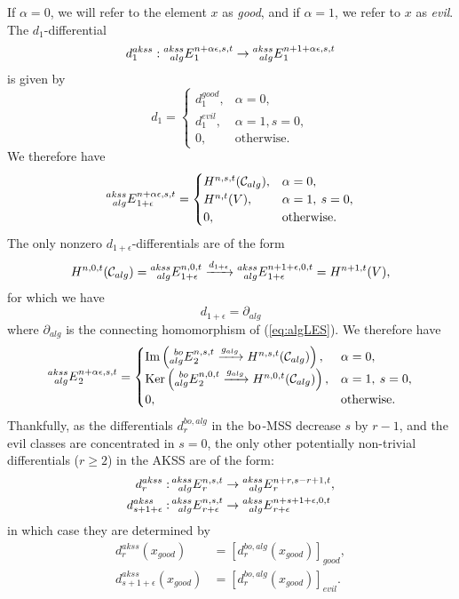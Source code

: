 If $\alpha = 0$, we will refer to the element $x$ as \emph{good}, and if $\alpha = 1$, we refer to $x$ as \emph{evil}.  
The $d_1$-differential 
$$ d^{akss}_{1}: \prescript{akss}{alg}{E}^{n+\alpha \epsilon, s, t}_1 \rightarrow \prescript{akss}{alg}{E}^{n+ 1+\alpha\epsilon, s,t}_1
$$
is given by
$$d_1 = 
\begin{cases}
d_1^{good}, & \alpha = 0, \\
d_1^{evil}, & \alpha = 1, s = 0, \\
0, & \text{otherwise}. 
\end{cases}
$$
We therefore have
$$\prescript{akss}{alg}{E}^{n+\alpha \epsilon, s, t}_{1+\epsilon} = 
\begin{cases}
H^{n, s, t}(\mathcal{C}_{alg}), & \alpha = 0, \\
H^{n, t}(V), & \alpha = 1, \: s = 0, \\
0, & \text{otherwise}.
\end{cases}
$$
The only nonzero $d_{1+\epsilon}$-differentials are of the form
$$ H^{n, 0, t}(\mathcal{C}_{alg}) = \prescript{akss}{alg}{E}^{n, {0}, t}_{1+\epsilon} \xrightarrow{d_{1+\epsilon}} \prescript{akss}{alg}{E}^{n+1 + \epsilon, 0, t}_{1+\epsilon} = H^{n+1, t}(V), $$
for which we have 
$$ d_{1+\epsilon} = \partial_{alg} $$
where $\partial_{alg}$ is the connecting homomorphism of (\ref{eq:algLES}).
We therefore have
$$ \prescript{akss}{alg}{E}^{n+\alpha\epsilon,s,t}_2 = 
\begin{cases}
\mathrm{Im} \left( \prescript{bo}{alg}{E}^{n, s, t}_{{2}} \xrightarrow{g_{alg}} H^{n, s, t}(\mathcal{C}_{alg}) \right), & \alpha = 0, \\
\mathrm{Ker} \left( \prescript{bo}{alg}{E}^{n, {0}, t}_{{2}} \xrightarrow{g_{alg}} H^{n, {0}, t}(\mathcal{C}_{alg}) \right), & \alpha = 1, \: s = 0, \\
0, & \text{otherwise}.
\end{cases} $$
Thankfully, as the differentials $d^{bo,alg}_r$ in the $\mathrm{bo}$-MSS decrease $s$ by $r-1$, and the evil classes are concentrated in $s = 0$, the only other potentially non-trivial differentials ($r \ge 2$) in the AKSS are of the form:
\begin{align*}
d^{akss}_r: & \prescript{akss}{alg}{E}_{r}^{n, s, t} \rightarrow \prescript{akss}{alg}{E}_{r}^{n+r, s-r+1, t}, \\
d^{akss}_{s + 1 + \epsilon}: & \prescript{akss}{alg}{E}_{r+\epsilon}^{n, s, t} \rightarrow \prescript{akss}{alg}{E}_{r+\epsilon}^{n+s+1+\epsilon, 0, t} \\
\end{align*}
in which case they are determined by 
\begin{align*}
d^{akss}_r(x_{good}) & = \left[d^{bo, alg}_r(x_{good}) \right]_{good}, \\
d^{akss}_{s+1+\epsilon}(x_{good}) & = \left[d^{bo, alg}_r(x_{good}) \right]_{evil}.
\end{align*}


